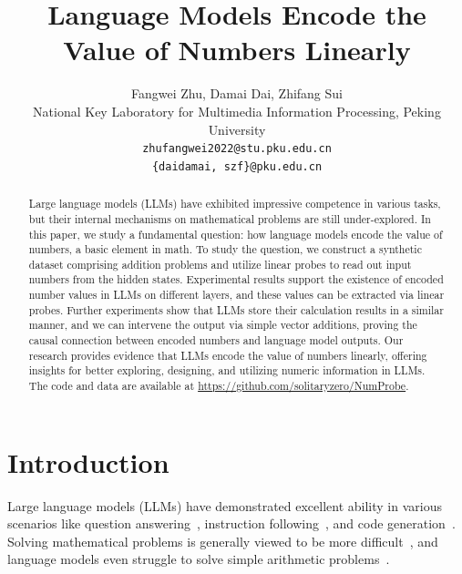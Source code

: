 \documentclass[11pt]{article}
\title{Language Models Encode the Value of Numbers Linearly}
\author{Fangwei Zhu, Damai Dai, Zhifang Sui \\
  National Key Laboratory for Multimedia Information Processing, Peking University \\
  \texttt{zhufangwei2022@stu.pku.edu.cn} \\
  \texttt{\{daidamai, szf\}@pku.edu.cn} \\
}
\begin{document}
\maketitle
\begin{abstract}
Large language models (LLMs) have exhibited impressive competence in various tasks, but their internal mechanisms on mathematical problems are still under-explored.
In this paper, we study a fundamental question: how language models encode the value of numbers, a basic element in math.
To study the question, we construct a synthetic dataset comprising addition problems and utilize linear probes to read out input numbers from the hidden states.
Experimental results support the existence of encoded number values in LLMs on different layers, and these values can be extracted via linear probes.
Further experiments show that LLMs store their calculation results in a similar manner, and we can intervene the output via simple vector additions, proving the causal connection between encoded numbers and language model outputs.
Our research provides evidence that LLMs encode the value of numbers linearly, offering insights for better exploring, designing, and utilizing numeric information in LLMs. 
The code and data are available at \url{https://github.com/solitaryzero/NumProbe}.
\end{abstract}

\section{Introduction}

Large language models (LLMs) have demonstrated excellent ability in various scenarios like question answering~\cite{zhao2023verify, li2023chain}, instruction following~\cite{brown2020language, ouyang2022training, taori2023stanford}, and code generation~\cite{chen2021evaluating, nijkamp2022codegen, li2023starcoder}.
Solving mathematical problems is generally viewed to be more difficult~\cite{yu2023metamath}, and language models even struggle to solve simple arithmetic problems~\cite{dziri2024faith}.
\end{document}
